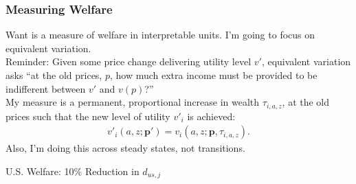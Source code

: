 \documentclass[9pt,pdftex,aspectratio=1610]{beamer}
\theoremstyle{definition}
\begin{document}

\begin{frame}[t]
\frametitle{Measuring Welfare}
\smallskip
Want is a measure of welfare in interpretable units. I'm going to focus on equivalent variation. \\
\medskip
Reminder: Given some price change delivering utility level $v'$, equivalent variation asks ``at the old prices, $p$, how much extra income must be provided to be indifferent between $v'$ and $v(p)$?''\\
\bigskip
\bigskip
My measure is a permanent, proportional increase in wealth $\tau_{i,a,z}$, at the old prices such that the new level of utility $v'_i$ is achieved:
\begin{align}
v'_i(a,z ; \mathbf{p'}) = v_i(a,z ; \mathbf{p}, \tau_{i, a,z}).  \nonumber
\end{align}
\bigskip
Also, I'm doing this across steady states, not transitions.
\end{frame}


\begin{frame}[t]{U.S. Welfare: 10\% Reduction in $d_{us,j}$}
\begin{figure}[!t]
\end{figure}
\end{frame}
\end{document}
